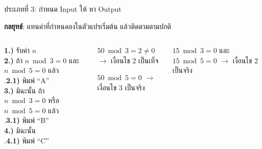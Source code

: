 \documentclass[11pt, aspectratio=169]{beamer}
\begin{document}
\begin{frame}{ประเภทที่ 3: กำหนด Input ให้ หา Output}
  \begin{explanation}
    \textbf{กลยุทธ์}: แทนค่าที่กำหนดลงในตัวแปรเริ่มต้น แล้วติดตามตามปกติ
  \end{explanation}

  \begin{columns}[T]
      \begin{pseudobox}
        \textbf{1.)} รับค่า $n$ \\
        \textbf{2.)} ถ้า $n \bmod 3 = 0$ และ $n \bmod 5 = 0$ แล้ว \\
        .\qquad \textbf{2.1)} พิมพ์ ``A'' \\
        \textbf{3.)} มิฉะนั้น ถ้า $n \bmod 3 = 0$ หรือ $n \bmod 5 = 0$ แล้ว \\
        .\qquad \textbf{3.1)} พิมพ์ ``B'' \\
        \textbf{4.)} มิฉะนั้น \\
        .\qquad \textbf{4.1)} พิมพ์ ``C''
      \end{pseudobox}
      \begin{solbox}[เมื่อ n เป็น 50]
        $50 \bmod 3 = 2 \neq 0$ $\rightarrow$ เงื่อนไข 2 เป็นเท็จ

        $50 \bmod 5 = 0$ $\rightarrow$ เงื่อนไข 3 เป็นจริง

      \end{solbox}

      \begin{exambox}[เมื่อ n เป็น 15]
        $15 \bmod 3 = 0$ และ $15 \bmod 5 = 0$ $\rightarrow$ เงื่อนไข 2 เป็นจริง
      \end{exambox}
  \end{columns}
\end{frame}
\end{document}
